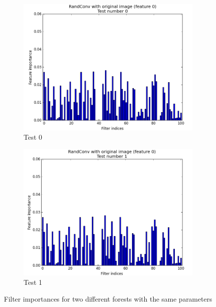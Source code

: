 \documentclass[a4paper]{report}
\begin{document}
		\begin{figure}
			\begin{subfigure}{.5\textwidth}
				\centering
				\includegraphics[width=1.\linewidth]{images/FIVarTree0.png}
				\caption{\label{fig:FIVarTree0}Test 0}
			\end{subfigure}%
			\begin{subfigure}{.5\textwidth}
				\centering
				\includegraphics[width=1.\linewidth]{images/FIVarTree1.png}
				\caption{\label{fig:FIVarTree1}Test 1}
			\end{subfigure}
			\caption{\label{fig:FIVarTree}Filter importances for two different forests with the same parameters}			
		\end{figure}
		
\end{document}
